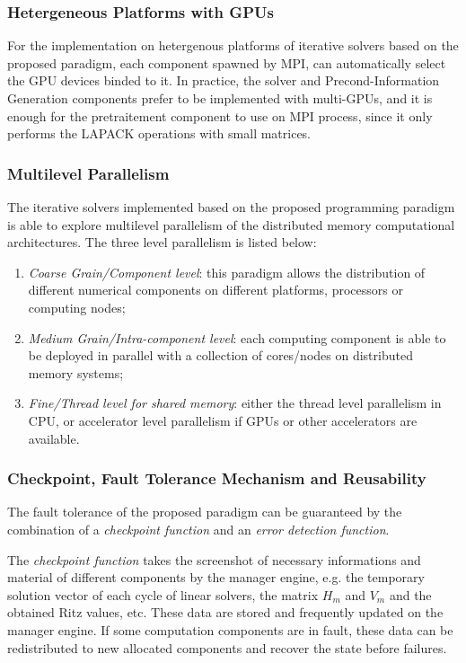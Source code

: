 \subsubsection{Hetergeneous Platforms with GPUs}

For the implementation on hetergenous platforms of iterative solvers based on the proposed paradigm, each component spawned by MPI, can automatically select the GPU devices binded to it. In practice, the solver and Precond-Information Generation components prefer to be implemented with multi-GPUs, and it is enough for the pretraitement component to use on MPI process, since it only performs the LAPACK operations with small matrices.

\subsubsection{Multilevel Parallelism}

The iterative solvers implemented based on the proposed programming paradigm is able to explore multilevel parallelism of the distributed memory computational architectures. The three level parallelism is listed below:

\begin{enumerate}
	\item \textit{Coarse Grain/Component level}: this paradigm allows the distribution of different numerical components on different platforms, processors or computing nodes;
	\item \textit{Medium Grain/Intra-component level}: each computing component is able to be deployed in parallel with a collection of cores/nodes on distributed memory systems;
	\item \textit{Fine/Thread level for shared memory}:  either the thread level parallelism in CPU, or accelerator level parallelism if GPUs or other accelerators are available. 
\end{enumerate} 

\subsubsection{Checkpoint, Fault Tolerance Mechanism and Reusability}

The fault tolerance of the proposed paradigm can be guaranteed by the combination of a \textit{checkpoint function} and an \textit{error detection function}. 

The \textit{checkpoint function} takes the screenshot of necessary informations and material of different components by the manager engine, e.g. the temporary solution vector of each cycle of linear solvers, the matrix $H_m$ and $V_m$ and the obtained Ritz values, etc. These data are stored and frequently updated on the manager engine. If some computation components are in fault, these data can be redistributed to new allocated components and recover the state before failures.

